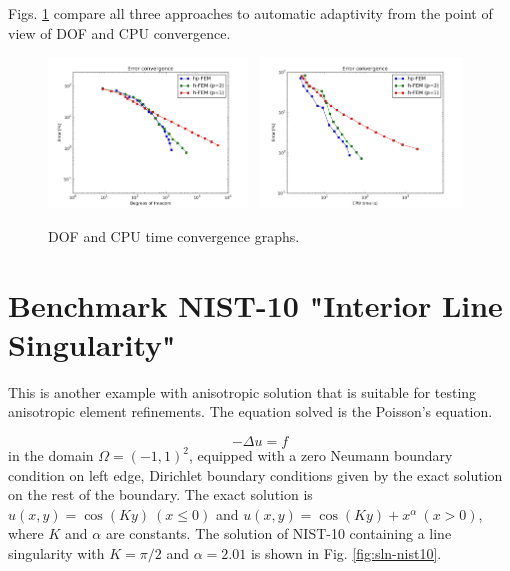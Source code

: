 \documentclass[12pt]{elsarticle}
\begin{document}
Figs. \ref{fig:nist-9-conv} compare all
three approaches to automatic adaptivity from the point
of view of DOF and CPU convergence.

\begin{figure}[H]
\centering
\includegraphics[height=4cm]{nist/nist-9/conv_dof_aniso.png}\ \
\includegraphics[height=4cm]{nist/nist-9/conv_cpu_aniso.png}
\caption{DOF and CPU time convergence graphs.}
\label{fig:nist-9-conv}
\end{figure}


\section{Benchmark NIST-10 "Interior Line Singularity"}
\label{sec:bench-10}

This is another example with anisotropic solution that is suitable for testing
anisotropic element refinements. The equation solved is the Poisson's equation.

\begin{equation} \label{interior}
-\Delta u = f
\end{equation}
in the domain $\Omega = (-1, 1)^2$, equipped with a zero
Neumann boundary condition on left edge, Dirichlet boundary
conditions given by the exact solution on the rest of the boundary.
The exact solution is
$u(x,y) = \cos(Ky)\ (x \le 0)$ and $u(x,y) = \cos(Ky) + x^{\alpha}\ (x > 0)$,
where $K$ and $\alpha$ are constants.
The solution of NIST-10 containing a line singularity with $K = \pi/2$ and
$\alpha = 2.01$ is shown in Fig. \ref{fig:sln-nist10}.
\end{document}
